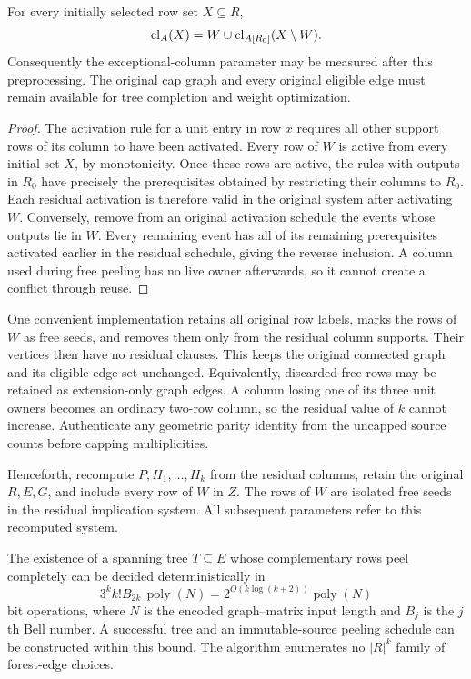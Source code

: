 \begin{proposition}
\label{prop:fpt-free-closure}
For every initially selected row set $X\subseteq R$,
\[
 \operatorname{cl}_A(X)
   =W\cup
     \operatorname{cl}_{A[R_0]}(X\setminus W).
\]
Consequently the exceptional-column parameter may be measured after
this preprocessing. The original cap graph and every original eligible
edge must remain available for tree completion and weight optimization.
\end{proposition}
\begin{proof}
The activation rule for a unit entry in row $x$ requires all other
support rows of its column to have been activated. Every row of $W$ is
active from every initial set $X$, by monotonicity. Once these rows are
active, the rules with outputs in $R_0$ have precisely the prerequisites
obtained by restricting their columns to $R_0$. Each residual activation
is therefore valid in the original system after activating $W$.
Conversely, remove from an original activation schedule the events whose
outputs lie in $W$. Every remaining event has all of its remaining
prerequisites activated earlier in the residual schedule, giving the
reverse inclusion. A column used during free peeling has no live owner
afterwards, so it cannot create a conflict through reuse.
\end{proof}

One convenient implementation retains all original row labels, marks
the rows of $W$ as free seeds, and removes them only from the residual
column supports. Their vertices then have no residual clauses. This
keeps the original connected graph and its eligible edge set unchanged.
Equivalently, discarded free rows may be retained as extension-only graph
edges. A column losing one of its three unit owners becomes an ordinary
two-row column, so the residual value of $k$ cannot increase. Authenticate
any geometric parity identity from the uncapped source counts before
capping multiplicities.

Henceforth, recompute $P,H_1,\ldots,H_k$ from the residual columns,
retain the original $R,E,G$, and include every row of $W$ in $Z$.
The rows of $W$ are isolated free seeds in the residual implication
system. All subsequent parameters refer to this recomputed system.

\begin{theorem}
\label{thm:column-fpt}
The existence of a spanning tree $T\subseteq E$ whose complementary
rows peel completely can be decided deterministically in
\[
       3^k k! B_{2k}\,\operatorname{poly}(N)
       =2^{O(k\log(k+2))}\operatorname{poly}(N)
\]
bit operations, where $N$ is the encoded graph--matrix input length and
$B_j$ is the $j$th Bell number. A successful tree and an immutable-source
peeling schedule can be constructed within this bound. The algorithm
enumerates no $|R|^k$ family of forest-edge choices.
\end{theorem}

